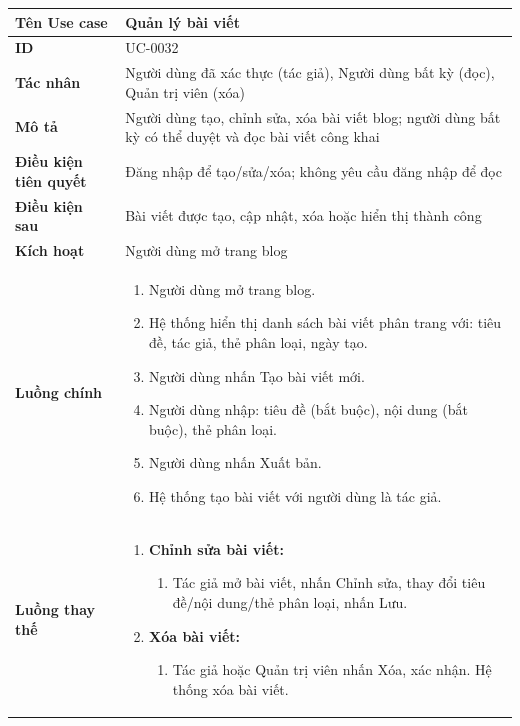 {
\small
\renewcommand{\arraystretch}{1.15}

\begin{tabularx}{\textwidth}{|>{\raggedright\arraybackslash}p{3.5cm}|>{\raggedright\arraybackslash}X|}
\hline
\textbf{Tên Use case} & Quản lý bài viết \\
\hline
\textbf{ID} & UC-0032 \\
\hline
\textbf{Tác nhân} & Người dùng đã xác thực (tác giả), Người dùng bất kỳ (đọc), Quản trị viên (xóa) \\
\hline
\textbf{Mô tả} & Người dùng tạo, chỉnh sửa, xóa bài viết blog; người dùng bất kỳ có thể duyệt và đọc bài viết công khai \\
\hline
\textbf{Điều kiện tiên quyết} & Đăng nhập để tạo/sửa/xóa; không yêu cầu đăng nhập để đọc \\
\hline
\textbf{Điều kiện sau} & Bài viết được tạo, cập nhật, xóa hoặc hiển thị thành công \\
\hline
\textbf{Kích hoạt} & Người dùng mở trang blog \\
\hline
\textbf{Luồng chính} &
\begin{enumerate}
    \item Người dùng mở trang blog.
    \item Hệ thống hiển thị danh sách bài viết phân trang với: tiêu đề, tác giả, thẻ phân loại, ngày tạo.
    \item Người dùng nhấn Tạo bài viết mới.
    \item Người dùng nhập: tiêu đề (bắt buộc), nội dung (bắt buộc), thẻ phân loại.
    \item Người dùng nhấn Xuất bản.
    \item Hệ thống tạo bài viết với người dùng là tác giả.
\end{enumerate} \\
\hline
\textbf{Luồng thay thế} &
\begin{enumerate}
    \item \textbf{Chỉnh sửa bài viết:}
    \begin{enumerate}
        \item[3A.] Tác giả mở bài viết, nhấn Chỉnh sửa, thay đổi tiêu đề/nội dung/thẻ phân loại, nhấn Lưu.
    \end{enumerate}
    \item \textbf{Xóa bài viết:}
    \begin{enumerate}
        \item[3B.] Tác giả hoặc Quản trị viên nhấn Xóa, xác nhận. Hệ thống xóa bài viết.

\end{enumerate}
\end{enumerate}
\end{tabularx}}
